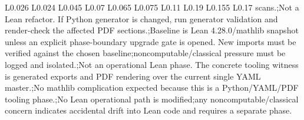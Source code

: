 \begin{longtable}{L{0.026\linewidth} L{0.024\linewidth} L{0.045\linewidth} L{0.07\linewidth} L{0.065\linewidth} L{0.075\linewidth} L{0.11\linewidth} L{0.19\linewidth} L{0.155\linewidth} L{0.17\linewidth}}
scans.;\newline Not a Lean refactor. If Python generator is changed, run generator validation and render-check the affected PDF sections.;\newline Baseline is Lean 4.28.0/\allowbreak{}mathlib snapshot unless an explicit phase-boundary upgrade gate is opened. New imports must be verified against the chosen baseline;\newline noncomputable/\allowbreak{}classical pressure must be logged and isolated.;\newline Not an operational Lean phase. The concrete tooling witness is generated exports and PDF rendering over the current single YAML master.;\newline No mathlib complication expected because this is a Python/\allowbreak{}YAML/\allowbreak{}PDF tooling phase.;\newline No Lean operational path is modified;\newline any noncomputable/\allowbreak{}classical concern indicates accidental drift into Lean code and requires a separate phase.\\
\hline
\addlinespace[0.24em]

\end{longtable}
